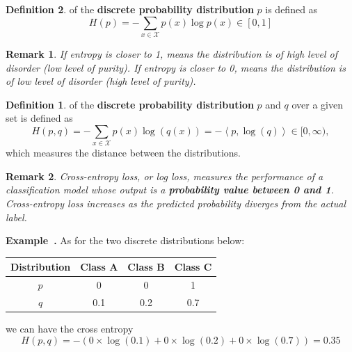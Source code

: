 \documentclass[a4paper]{article}
\theoremstyle{definition}
\newtheorem{definition}{Definition}
\theoremstyle{plain}
\newtheorem{remark}{Remark}
\newenvironment{example}[1][]{\refstepcounter{example}\par\medskip
   \noindent \textbf{Example~\theexample. #1} \rmfamily}{\medskip}
\newcounter{example}{Example}
\begin{document}
\begin{definition}
 of the \textbf{discrete probability distribution} $p$ is defined as
\begin{equation*}
   H(p)=-\sum _{x\in {\mathcal {X}}}{p (x)\log p (x)} \in[0,1]
\end{equation*}

\begin{remark}
If entropy is closer to 1, means the distribution is of high level of disorder (low level of purity). If entropy is closer to 0, means the distribution is of low level of disorder (high level of purity).
\end{remark}

\begin{definition}
 of the \textbf{discrete probability distribution} $p$ and $q$ over a given set is defined as 
\begin{equation*}
    H(p,q)=-\sum_{x\in {\mathcal {X}}} p(x)\log(q(x))=-\left<p,\log(q)\right>\in[0,\infty),
\end{equation*}
which measures the distance between the distributions.
\end{definition}

\begin{remark}
Cross-entropy loss, or log loss, measures the performance of a classification model whose output is a \textbf{probability value between 0 and 1}. Cross-entropy loss increases as the predicted probability diverges from the actual label. 
\end{remark}

\end{definition}

\begin{example}
As for the two discrete distributions below:
\begin{table}[H]
\centering
\begin{tabular}{cccc}
\hline
\textbf{Distribution} & \textbf{Class A} & \textbf{Class B} & \textbf{Class C} \\ \hline
$p$            & 0       & 0       & 1    \\ 
$q$           & 0.1     & 0.2     & 0.7        \\ \hline
\end{tabular}
\end{table}
we can have the cross entropy 
\begin{equation*}
    H(p,q)=-(0\times\log(0.1)+0\times\log(0.2)+0\times\log(0.7))=0.35
\end{equation*}
\end{example}
\end{document}
